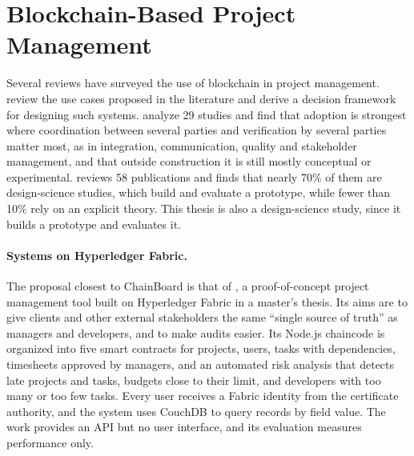 \section{Blockchain-Based Project Management}
\label{sec:related-pm}

Several reviews have surveyed the use of blockchain in project management. \textcite{sonmez2021review} review the use cases proposed in the literature and derive a decision framework for designing such systems. \textcite{noteboom2026coordination} analyze 29 studies and find that adoption is strongest where coordination between several parties and verification by several parties matter most, as in integration, communication, quality and stakeholder management, and that outside construction it is still mostly conceptual or experimental. \textcite{seru2025design} reviews 58 publications and finds that nearly 70\% of them are design-science studies, which build and evaluate a prototype, while fewer than 10\% rely on an explicit theory. This thesis is also a design-science study, since it builds a prototype and evaluates it.

\paragraph*{Systems on Hyperledger Fabric.} The proposal closest to ChainBoard is that of \textcite{batista2021}, a proof-of-concept project management tool built on Hyperledger Fabric in a master's thesis. Its aims are to give clients and other external stakeholders the same ``single source of truth'' as managers and developers, and to make audits easier. Its Node.js chaincode is organized into five smart contracts for projects, users, tasks with dependencies, timesheets approved by managers, and an automated risk analysis that detects late projects and tasks, budgets close to their limit, and developers with too many or too few tasks. Every user receives a Fabric identity from the certificate authority, and the system uses CouchDB to query records by field value. The work provides an API but no user interface, and its evaluation measures performance only.


